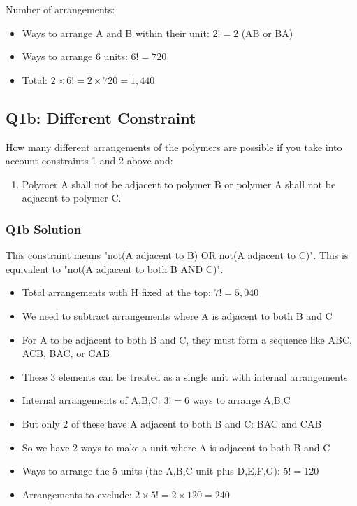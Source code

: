 \documentclass{article}
\begin{document}
Number of arrangements:
\begin{itemize}
    \item Ways to arrange A and B within their unit: $2! = 2$ (AB or BA)
    \item Ways to arrange 6 units: $6! = 720$
    \item Total: $2 \times 6! = 2 \times 720 = 1,440$
\end{itemize}


\subsection*{Q1b: Different Constraint}

How many different arrangements of the polymers are possible if you take into account constraints 1 and 2 above and:

\begin{enumerate}[resume]
    \item Polymer A shall not be adjacent to polymer B or polymer A shall not be adjacent to polymer C.
\end{enumerate}

\subsubsection*{Q1b Solution}

This constraint means "not(A adjacent to B) OR not(A adjacent to C)". This is equivalent to "not(A adjacent to both B AND C)".

\begin{itemize}
    \item Total arrangements with H fixed at the top: $7! = 5,040$
    \item We need to subtract arrangements where A is adjacent to both B and C
    \item For A to be adjacent to both B and C, they must form a sequence like ABC, ACB, BAC, or CAB
    \item These 3 elements can be treated as a single unit with internal arrangements
    \item Internal arrangements of A,B,C: $3! = 6$ ways to arrange A,B,C
    \item But only 2 of these have A adjacent to both B and C: BAC and CAB
    \item So we have 2 ways to make a unit where A is adjacent to both B and C
    \item Ways to arrange the 5 units (the A,B,C unit plus D,E,F,G): $5! = 120$
    \item Arrangements to exclude: $2 \times 5! = 2 \times 120 = 240$
\end{itemize}
\end{document}
